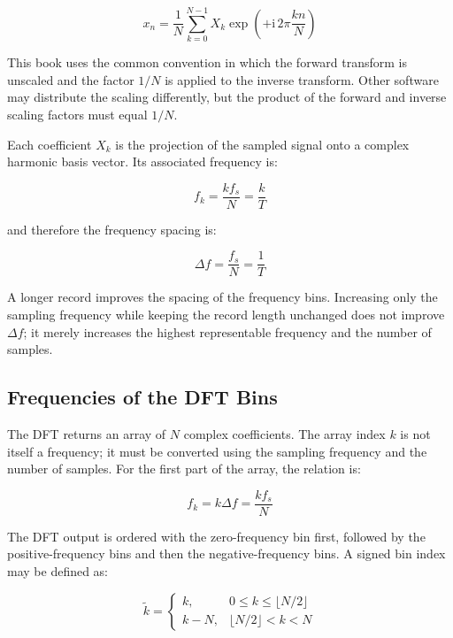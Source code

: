 \begin{equation}
    x_n = \frac{1}{N}\sum_{k=0}^{N-1} X_k
    \exp\left(+\mathrm{i}\,2\pi\frac{kn}{N}\right)
\end{equation}

This book uses the common convention in which the forward transform is
unscaled and the factor $ 1/N $ is applied to the inverse transform. Other
software may distribute the scaling differently, but the product of the
forward and inverse scaling factors must equal $ 1/N $.

Each coefficient $ X_k $ is the projection of the sampled signal onto a complex
harmonic basis vector. Its associated frequency is:

\begin{equation}
    f_k = \frac{k f_s}{N} = \frac{k}{T}
\end{equation}

and therefore the frequency spacing is:

\begin{equation}
    \Delta f = \frac{f_s}{N} = \frac{1}{T}
\end{equation}

A longer record improves the spacing of the frequency bins. Increasing only
the sampling frequency while keeping the record length unchanged does not
improve $ \Delta f $; it merely increases the highest representable frequency
and the number of samples.

\subsection{Frequencies of the DFT Bins}

The DFT returns an array of $ N $ complex coefficients. The array index $ k $
is not itself a frequency; it must be converted using the sampling frequency
and the number of samples. For the first part of the array, the relation is:

\begin{equation}
    f_k = k\Delta f = \frac{k f_s}{N}
\end{equation}

The DFT output is ordered with the zero-frequency bin first, followed by the
positive-frequency bins and then the negative-frequency bins. A signed bin
index may be defined as:

\begin{equation}
    \widetilde{k} =
    \begin{cases}
        k, & 0\leq k\leq \lfloor N/2\rfloor \\
        k-N, & \lfloor N/2\rfloor < k < N
    \end{cases}
\end{equation}

